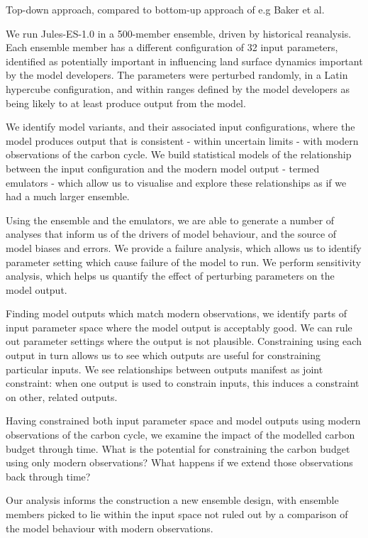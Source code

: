 \documentclass[gmd, manuscript]{copernicus}
\begin{document}
Top-down approach, compared to bottom-up approach of e.g Baker et al.

We run Jules-ES-1.0 in a 500-member ensemble, driven by historical reanalysis. Each ensemble member has a different configuration of 32 input parameters, identified as potentially important in influencing land surface dynamics important by the  model developers. The parameters were perturbed randomly, in a Latin hypercube configuration, and within ranges defined by the model developers as being likely to at least produce output from the model.

We identify model variants, and their associated input configurations, where the model produces output that is consistent - within uncertain limits - with modern observations of the carbon cycle. We build statistical models of the relationship between the input configuration and the modern model output - termed emulators - which allow us to visualise and explore these relationships as if we had a much larger ensemble.

Using the ensemble and the emulators, we are able to generate a number of analyses that inform us of the drivers of model behaviour, and the source of model biases and errors. We provide a failure analysis, which allows us to identify parameter setting which cause failure of the model to run. We perform sensitivity analysis, which helps us quantify the effect of perturbing parameters on the model output.

Finding model outputs which match modern observations, we identify parts of input parameter space where the model output is acceptably good. We can rule out parameter settings where the output is not plausible. Constraining using each output in turn allows us to see which outputs are useful for constraining particular inputs. We see relationships between outputs manifest as joint constraint: when one output is used to constrain inputs, this induces a constraint on other, related outputs.

Having constrained both input parameter space and model outputs using modern observations of the carbon cycle, we examine the impact of the modelled carbon budget through time. What is the potential for constraining the carbon budget using only modern observations? What happens if we extend those observations back through time?

Our analysis informs the construction a new ensemble design, with ensemble members picked to lie within the input space not ruled out by a comparison of the model behaviour with modern observations. 
\end{document}
